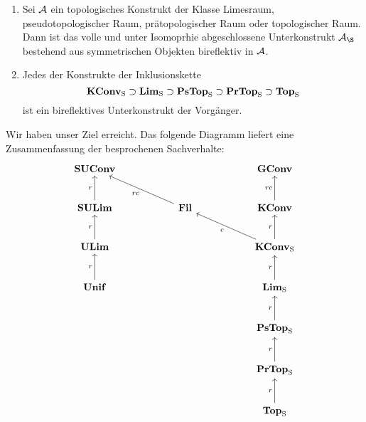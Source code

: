 \begin{prop}
  \begin{enumerate}[1)]
    \item Sei $\mathcal{A}$ ein topologisches Konstrukt der Klasse Limesraum, pseudotopologischer Raum, prätopologischer Raum oder topologischer Raum.
      Dann ist das volle und unter Isomoprhie abgeschlossene Unterkonstrukt $\A_\S$ bestehend aus symmetrischen Objekten bireflektiv in $\mathcal{A}$.
    \item Jedes der Konstrukte der Inklusionskette
      $$
      \mathbf{KConv}_{\mathrm{S}} \supset \mathbf{Lim}_{\mathrm{S}} \supset \mathbf{PsTop}_{\mathrm{S}} \supset \mathbf{PrTop}_{\mathrm{S}} \supset \mathbf{Top}_{\mathrm{S}}
      $$
      ist ein bireflektives Unterkonstrukt der Vorgänger.
  \end{enumerate}
\end{prop}

Wir haben unser Ziel erreicht. Das folgende Diagramm liefert eine Zusammenfassung der besprochenen Sachverhalte:
$$
\begin{tikzcd}[column sep=5.5em,row sep=2.5em]
  \SUConv              &        & \GConv \\
  \SULim \arrow[u,"r"] &  \Fil\arrow[lu,"rc"]  & \KConv   \arrow[u,"rc"] \\
  \ULim  \arrow[u,"r"] &        & \KConv_\Sy \arrow[lu,"c"]    \arrow[u,"r"]    \\
  \Unif  \arrow[u,"r"] &        & \Lim_\Sy   \arrow[u,"r"]    \\
                       &        & \PsTop_\Sy \arrow[u,"r"]    \\
                       &        & \PrTop_\Sy \arrow[u,"r"]    \\
                       &        & \Top_\Sy   \arrow[u,"r"]    
\end{tikzcd}
$$
